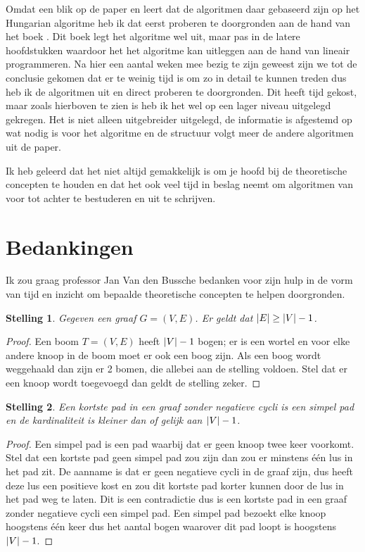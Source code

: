 \documentclass[conference]{IEEEtran}
\newtheorem{theorem}{Stelling}[section]
\theoremstyle{definition}
\DeclarePairedDelimiter{\card}{\vert}{\vert}  %
\begin{document}
Omdat een blik op de paper \cite{Scaling} en \cite{FasterScaling} leert dat de algoritmen daar gebaseerd zijn op het Hungarian algoritme heb ik dat eerst proberen te doorgronden aan de hand van het boek  \cite{combinatorialOptimization}. Dit boek legt het algoritme wel uit, maar pas in de latere hoofdstukken waardoor het het algoritme kan uitleggen aan de hand van lineair programmeren. Na hier een aantal weken mee bezig te zijn geweest zijn we tot de conclusie gekomen dat er te weinig tijd is om zo in detail te kunnen treden dus heb ik de algoritmen uit \cite{Scaling} en \cite{FasterScaling} direct proberen te doorgronden. Dit heeft tijd gekost, maar zoals hierboven te zien is heb ik het wel op een lager niveau uitgelegd gekregen. Het is niet alleen uitgebreider uitgelegd, de informatie is afgestemd op wat nodig is voor het algoritme en de structuur volgt meer de andere algoritmen uit de paper.

Ik heb geleerd dat het niet altijd gemakkelijk is om je hoofd bij de theoretische concepten te houden en dat het ook veel tijd in beslag neemt om algoritmen van voor tot achter te bestuderen en uit te schrijven.


\section*{Bedankingen}
Ik zou graag professor Jan Van den Bussche bedanken voor zijn hulp in de vorm van tijd en inzicht om bepaalde theoretische concepten te helpen doorgronden.


\printbibliography

\appendix \label{appendix:stellingen}
\begin{theorem}
    Gegeven een graaf $G = (V, E)$. Er geldt dat $\card{E} \geq \card{V} - 1$.
\end{theorem}
\begin{proof}
    Een boom $T = (V, E)$ heeft $\card{V} - 1$ bogen; er is een wortel en voor elke andere knoop in de boom moet er ook een boog zijn. Als een boog wordt weggehaald dan zijn er 2 bomen, die allebei aan de stelling voldoen. Stel dat er een knoop wordt toegevoegd dan geldt de stelling zeker.
\end{proof}
\begin{theorem} \label{appendix:aantalBogenInKortstePad}
    Een kortste pad in een graaf zonder negatieve cycli is een simpel pad en de kardinaliteit is kleiner dan of gelijk aan $\card{V} - 1$.
\end{theorem}
\begin{proof}
    Een simpel pad is een pad waarbij dat er geen knoop twee keer voorkomt. Stel dat een kortste pad geen simpel pad zou zijn dan zou er minstens één lus in het pad zit. De aanname is dat er geen negatieve cycli in de graaf zijn, dus heeft deze lus een positieve kost en zou dit kortste pad korter kunnen door de lus in het pad weg te laten. Dit is een contradictie dus is een kortste pad in een graaf zonder negatieve cycli een simpel pad. Een simpel pad bezoekt elke knoop hoogstens één keer dus het aantal bogen waarover dit pad loopt is hoogstens $\card{V} - 1$.
\end{proof}
\end{document}
